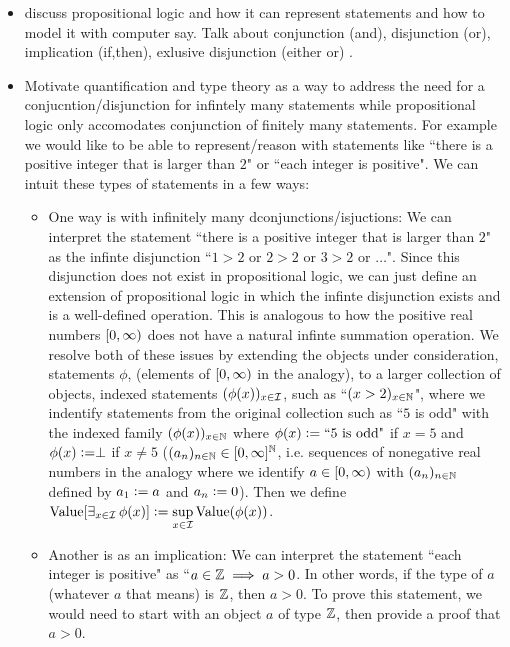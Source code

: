 \documentclass{book}
\begin{document}
	\begin{itemize}
		\item discuss propositional logic and how it can represent statements and how to model it with computer say. Talk about conjunction (and), disjunction (or), implication (if,then), exlusive disjunction (either or) .    
		\item Motivate quantification and type theory as a way to address the need for a conjucntion/disjunction for infintely many statements while propositional logic only accomodates conjunction of finitely many statements. For example we would like to be able to represent/reason with statements like ``there is a positive integer that is larger than $2$" or ``each integer is positive". We can intuit these types of statements in a few ways: 
		\begin{itemize}
			\item One way is with infinitely many dconjunctions/isjuctions: We can interpret the statement ``there is a positive integer that is larger than $2$" as the infinte disjunction ``$1 > 2$ or $2 > 2$ or $3 > 2$ or $\ldots$". Since this disjunction does not exist in propositional logic, we can just define an extension of propositional logic in which the infinte disjunction exists and is a well-defined operation. This is analogous to how the positive real numbers $[0,\infty)$ does not have a natural infinte summation operation. We resolve both of these issues by extending the objects under consideration, statements $\phi$, (elements of $[0,\infty)$ in the analogy), to a larger collection of objects, indexed statements $(\phi(x))_{x \in \mathcal{I}}$, such as ``$(x > 2)_{x \in \mathbb{N}}$", where we indentify statements from the original collection such as ``$5$ is odd" with the indexed family $(\phi(x))_{x \in \mathbb{N}}$ where $\phi(x) \vcentcolon= \text{``$5$ is odd"}$ if $x = 5$ and $\phi(x) \vcentcolon= \perp$ if $x \neq 5$ ($(a_n)_{n \in \mathbb{N}} \in [0,\infty]^{\mathbb{N}}$, i.e. sequences of nonegative real numbers in the analogy where we identify $a \in [0,\infty)$ with $(a_n)_{n \in \mathbb{N}}$ defined by $a_1 \vcentcolon= a$ and $a_n \vcentcolon= 0$). Then we define $\text{Value}[\operatorname{\exists}\limits_{x \in \mathcal{I}} \phi(x)] \vcentcolon= \sup\limits_{x \in \mathcal{I}} \text{Value}(\phi(x))$. 
			\item Another is as an implication: We can interpret the statement ``each integer is positive" as ``$a \in \mathbb{Z} \implies a >0$. In other words, if the type of $a$ (whatever $a$ that means) is $\mathbb{Z}$, then $a > 0$. To prove this statement, we would need to start with an object $a$ of type $\mathbb{Z}$, then provide a proof that $a > 0$. 

\end{itemize}
\end{itemize}
\end{document}
